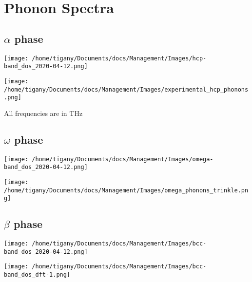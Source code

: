 \documentclass[11pt]{article}
\begin{document}
\section*{Phonon Spectra}
\label{sec:org549456e}

\subsection*{\(\alpha\) phase}
\label{sec:org725fc24}
\begin{center}
\texttt{[image: /home/tigany/Documents/docs/Management/Images/hcp-band\_dos\_2020-04-12.png]}
\label{org9c236a3}
\end{center}

\begin{center}
\texttt{[image: /home/tigany/Documents/docs/Management/Images/experimental\_hcp\_phonons.png]}
\end{center}

\begin{notes}
All frequencies are in THz
\end{notes}

\subsection*{\(\omega\) phase}
\label{sec:org893bb80}
\begin{center}
\texttt{[image: /home/tigany/Documents/docs/Management/Images/omega-band\_dos\_2020-04-12.png]}
\label{orgb27569e}
\end{center}

\begin{center}
\texttt{[image: /home/tigany/Documents/docs/Management/Images/omega\_phonons\_trinkle.png]}
\end{center}


\subsection*{\(\beta\) phase}
\label{sec:org3b0a5db}
\begin{center}
\texttt{[image: /home/tigany/Documents/docs/Management/Images/bcc-band\_dos\_2020-04-12.png]}
\label{org3eec76c}
\end{center}

\begin{center}
\texttt{[image: /home/tigany/Documents/docs/Management/Images/bcc-band\_dos\_dft-1.png]}
\end{center}
\end{document}
